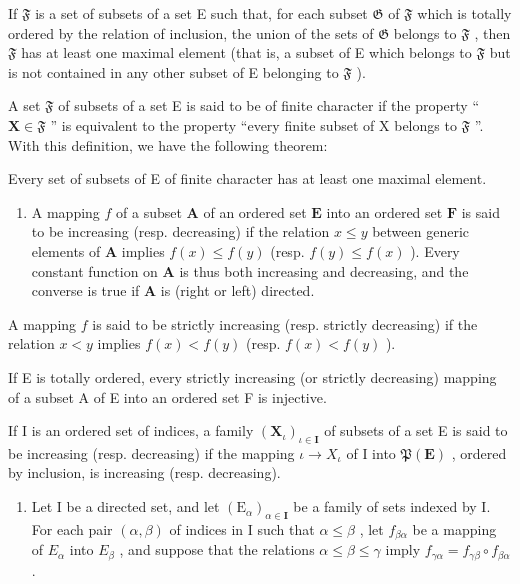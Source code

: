 If \(\mathfrak{F}\) is a set of subsets of a set E such that, for each subset \(\mathfrak{G}\) of \(\mathfrak{F}\) which is totally ordered by the relation of inclusion, the union of the sets of \(\mathfrak{G}\) belongs to \(\mathfrak{F}\) , then \(\mathfrak{F}\) has at least one maximal element (that is, a subset of E which belongs to \(\mathfrak{F}\) but is not contained in any other subset of E belonging to \(\mathfrak{F}\) ).

A set \(\mathfrak{F}\) of subsets of a set E is said to be of finite character if the property `` \(\mathbf{X} \in \mathfrak{F}\) '' is equivalent to the property ``every finite subset of X belongs to \(\mathfrak{F}\) ''. With this definition, we have the following theorem:

Every set of subsets of E of finite character has at least one maximal element.

\begin{enumerate}
\def\labelenumi{\arabic{enumi}.}
\setcounter{enumi}{11}
\tightlist
\item
  A mapping \(f\) of a subset \(\mathbf{A}\) of an ordered set \(\mathbf{E}\) into an ordered set \(\mathbf{F}\) is said to be increasing (resp. decreasing) if the relation \(x \leqslant y\) between generic elements of \(\mathbf{A}\) implies \(f(x) \leqslant f(y)\) (resp. \(f(y) \leqslant f(x)\) ). Every constant function on \(\mathbf{A}\) is thus both increasing and decreasing, and the converse is true if \(\mathbf{A}\) is (right or left) directed.
\end{enumerate}

A mapping \(f\) is said to be strictly increasing (resp. strictly decreasing) if the relation \(x < y\) implies \(f(x) < f(y)\) (resp. \(f(x) < f(y)\) ).

If E is totally ordered, every strictly increasing (or strictly decreasing) mapping of a subset A of E into an ordered set F is injective.

If I is an ordered set of indices, a family \((\mathbf{X}_{\iota})_{\iota\in\mathbf{I}}\) of subsets of a set E is said to be increasing (resp. decreasing) if the mapping \(\iota\to X_{\iota}\) of I into \(\mathfrak{P}(\mathbf{E})\) , ordered by inclusion, is increasing (resp. decreasing).

\begin{enumerate}
\def\labelenumi{\arabic{enumi}.}
\setcounter{enumi}{12}
\tightlist
\item
  Let I be a directed set, and let \((\mathrm{E}_{\alpha})_{\alpha\in\mathbf{I}}\) be a family of sets indexed by I. For each pair \((\alpha,\beta)\) of indices in I such that \(\alpha\leqslant\beta\) , let \(f_{\beta\alpha}\) be a mapping of \(E_{\alpha}\) into \(E_{\beta}\) , and suppose that the relations \(\alpha\leqslant\beta\leqslant\gamma\) imply \(f_{\gamma\alpha}=f_{\gamma\beta}\circ f_{\beta\alpha}\) .
\end{enumerate}

